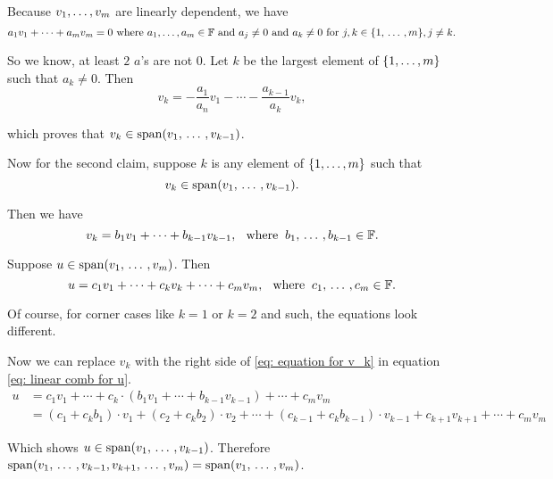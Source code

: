 \begin{prf}
  Because $v_1, \dots, v_m$ are linearly dependent, we have
  \begin{equation}
    a_1 v_1 + \cdots + a_m v_m = 0
    $ where $a_1, \ldots, a_m \in \myF$ and $a_j \neq 0$ and $a_k \neq 0 $ for $j,k \in \{1, \ddd, m\}, j \neq k.
  \end{equation}

  So we know, at least $2$ $a$'s are not $0$.
  Let $k$ be the largest element of $\{ 1, \ldots, m \}$ such that $a_k \neq 0$. Then
  \begin{equation}
    v_k = - \frac{a_1}{a_n}v_1 - \cdots - \frac{a_{k-1}}{a_k}v_k,
  \end{equation}

  which proves that $v_k \in \operatorname{span} (v_1, {\, \ldots \,\,}, v_{k-1})$.

  Now for the second claim, suppose $k$ is any element of $\{ 1, \ldots, m \}$ such that
  \begin{equation}
    v_k \in \operatorname{span} (v_1, {\, \ldots \,\,}, v_{k-1}).
  \end{equation}

  Then we have
  \begin{equation}
    \label{eq: equation for v_k}
    v_k = b_1v_1 + \cdots + b_{k-1}v_{k-1}, \;\;\, \text{where}\;\; b_1, {\, \ldots \,\,}, b_{k-1} \in \mathbb{F}.
  \end{equation}

  Suppose $u \in \operatorname{span} (v_1, {\, \ldots \,\,}, v_m)$. Then
  \begin{equation}
    \label{eq: linear comb for u}
    u = c_1v_1 + \cdots + c_kv_k + \cdots +c_{m}v_{m}, \;\;\, \text{where}\;\; c_1, {\, \ldots \,\,}, c_{m} \in \mathbb{F}.
  \end{equation}

  Of course, for corner cases like $k=1$ or $k=2$ and such, the equations look different.

  Now we can replace $v_k$ with the right side of \eqref{eq: equation for v_k} in equation \eqref{eq: linear comb for u}.
  \begin{equation}
    \begin{aligned}
      u
      & = c_1v_1 + \cdots + c_k \cdot (b_1v_1 + \cdots + b_{k-1}v_{k-1}) + \cdots +c_{m}v_{m} \\
      & = (c_1 + c_k b_1)\cdot v_1 + (c_2 + c_k b_2) \cdot v_2 + \cdots + (c_{k-1}+c_k b_{k-1}) \cdot v_{k-1} + c_{k+1} v_{k+1} + \cdots + c_m v_m
    \end{aligned}
  \end{equation}

  Which shows $u \in \operatorname{span} (v_1, {\, \ldots \,\,}, v_{k-1})$. Therefore $\operatorname{span} (v_1, {\, \ldots \,\,}, v_{k-1}, v_{k+1}, {\, \ldots \,\,}, v_m) = \operatorname{span} (v_1, {\, \ldots \,\,}, v_m)$.

\end{prf}
\setcounter{thm}{21}


